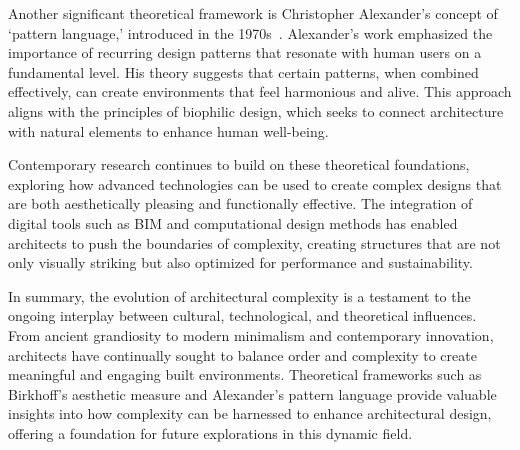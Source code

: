 Another significant theoretical framework is Christopher Alexander's concept of `pattern language,' introduced in the 1970s~\cite{Alexander1977}.
Alexander's work emphasized the importance of recurring design patterns that resonate with human users on a fundamental level.
His theory suggests that certain patterns, when combined effectively, can create environments that feel harmonious and alive.
This approach aligns with the principles of biophilic design, which seeks to connect architecture with natural elements to enhance human well-being.

Contemporary research continues to build on these theoretical foundations, exploring how advanced technologies can be used to create complex designs that are both aesthetically pleasing and functionally effective.
The integration of digital tools such as BIM and computational design methods has enabled architects to push the boundaries of complexity, creating structures that are not only visually striking but also optimized for performance and sustainability.

In summary, the evolution of architectural complexity is a testament to the ongoing interplay between cultural, technological, and theoretical influences.
From ancient grandiosity to modern minimalism and contemporary innovation, architects have continually sought to balance order and complexity to create meaningful and engaging built environments.
Theoretical frameworks such as Birkhoff's aesthetic measure and Alexander's pattern language provide valuable insights into how complexity can be harnessed to enhance architectural design, offering a foundation for future explorations in this dynamic field.


